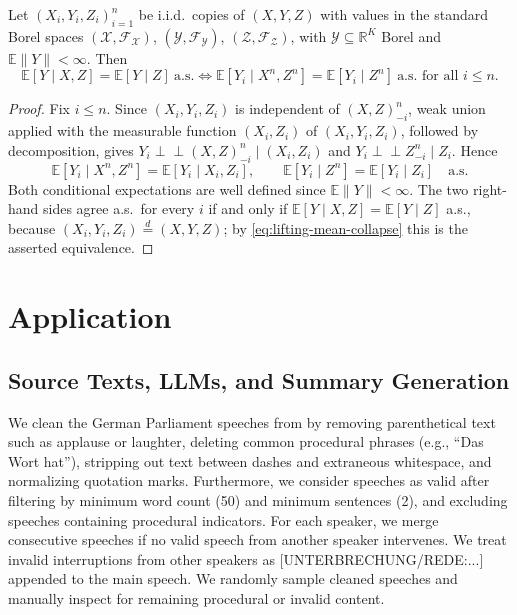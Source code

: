 \documentclass[twoside,11pt]{article}
\newcommand{\indep}{\perp \!\!\! \perp}
\begin{document}
\begin{lemma}\label{lem:lifting-mean}
Let $(X_i,Y_i,Z_i)_{i=1}^n$ be i.i.d.\ copies of $(X,Y,Z)$ with values in the standard
Borel spaces $(\mathcal X,\mathcal F_{\mathcal X})$, $(\mathcal Y,\mathcal F_{\mathcal Y})$,
$(\mathcal Z,\mathcal F_{\mathcal Z})$, with $\mathcal Y\subseteq\mathbb R^K$ Borel and
$\mathbb E\|Y\|<\infty$. Then
\[
  \mathbb E[Y\mid X,Z]=\mathbb E[Y\mid Z]\ \text{a.s.}
  \iff
  \mathbb E[Y_i\mid X^n,Z^n]=\mathbb E[Y_i\mid Z^n]\ \text{a.s. for all } i\le n .
\]
\end{lemma}
\begin{proof}
Fix $i\le n$. Since $(X_i,Y_i,Z_i)$ is independent of $(X,Z)^n_{-i}$, weak union applied
with the measurable function $(X_i,Z_i)$ of $(X_i,Y_i,Z_i)$, followed by decomposition,
gives $Y_i\indep (X,Z)^n_{-i}\mid (X_i,Z_i)$ and $Y_i\indep Z^n_{-i}\mid Z_i$. Hence
\begin{equation}\label{eq:lifting-mean-collapse}
  \mathbb E[Y_i\mid X^n,Z^n]=\mathbb E[Y_i\mid X_i,Z_i],
  \qquad
  \mathbb E[Y_i\mid Z^n]=\mathbb E[Y_i\mid Z_i]
  \quad\text{a.s.}
\end{equation}
Both conditional expectations are well defined since $\mathbb E\|Y\|<\infty$. The two
right-hand sides agree a.s.\ for every $i$ if and only if
$\mathbb E[Y\mid X,Z]=\mathbb E[Y\mid Z]$ a.s., because
$(X_i,Y_i,Z_i)\stackrel{d}{=}(X,Y,Z)$; by \eqref{eq:lifting-mean-collapse} this is the
asserted equivalence.
\end{proof}

\printProofs

\section{Application}\label{app:app_details}

\subsection{Source Texts, LLMs, and Summary Generation}\label{app:summary_gen_details}

We clean the German Parliament speeches from \cite{richter2020opendiscourse} by removing parenthetical text such as applause or laughter, deleting common procedural phrases (e.g., “Das Wort hat”), stripping out text between dashes and extraneous whitespace, and normalizing quotation marks. %
Furthermore, we consider speeches as valid after filtering by minimum word count (50) and minimum sentences (2), and excluding speeches containing procedural indicators. 
For each speaker, we merge consecutive speeches if no valid speech from another speaker intervenes. We treat invalid interruptions from other speakers as [UNTERBRECHUNG/REDE:...] appended to the main speech. We randomly sample cleaned speeches and manually inspect for remaining procedural or invalid content.
\end{document}
